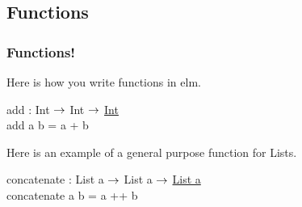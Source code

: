 \subsection{Functions}
    \begin{frame}

        \frametitle{Functions!}
        Here is how you write functions in elm.
        
        \begin{codeexample}
            add : Int $\rightarrow$ Int $\rightarrow$ \underline{Int}\\
            add a b = a + b
        \end{codeexample}
        
        Here is an example of a general purpose function for Lists.

        \begin{codeexample}
            concatenate : List a $\rightarrow$ List a $\rightarrow$ \underline{List a}\\
            concatenate a b = a ++ b
        \end{codeexample}

    \end{frame}